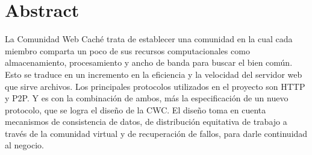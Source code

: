 

\begingroup
\let\clearpage\relax
\let\cleardoublepage\relax
\let\cleardoublepage\relax

\chapter*{Abstract} %

La Comunidad Web Caché trata de establecer una comunidad en la cual cada miembro comparta un poco de sus recursos computacionales como almacenamiento, procesamiento y ancho de banda para buscar el bien común. Esto se traduce en un incremento en la eficiencia y la velocidad del servidor web que sirve archivos. Los principales protocolos utilizados en el proyecto son HTTP y P2P. Y es con la combinación de ambos, más la especificación de un nuevo protocolo, que se logra el diseño de la CWC. El diseño toma en cuenta mecanismos de consistencia de datos, de distribución equitativa de trabajo a través de la comunidad virtual y de recuperación de fallos, para darle continuidad al negocio. 

\endgroup			

\vfill